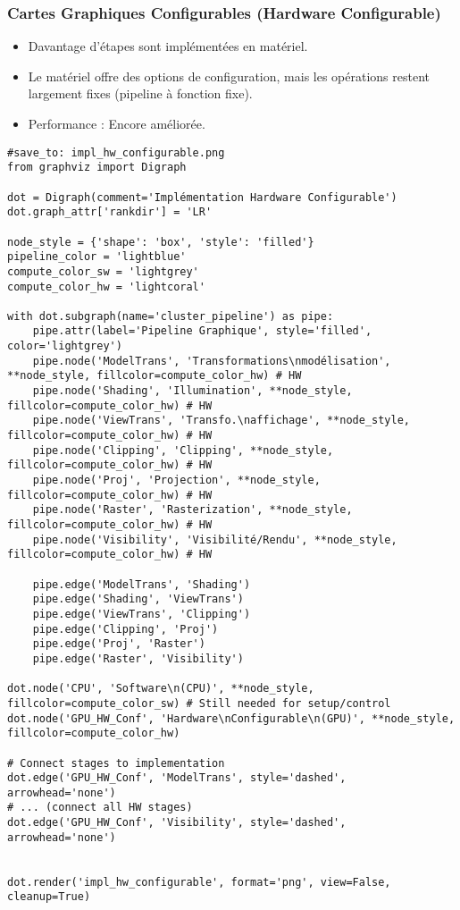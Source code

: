 \documentclass{article}
\begin{document}
\subsubsection{Cartes Graphiques Configurables (Hardware Configurable)}
\begin{itemize}
    \item Davantage d'étapes sont implémentées en matériel.
    \item Le matériel offre des options de configuration, mais les opérations restent largement fixes (pipeline à fonction fixe).
    \item Performance : Encore améliorée.
\end{itemize}

\begin{verbatim}
#save_to: impl_hw_configurable.png
from graphviz import Digraph

dot = Digraph(comment='Implémentation Hardware Configurable')
dot.graph_attr['rankdir'] = 'LR'

node_style = {'shape': 'box', 'style': 'filled'}
pipeline_color = 'lightblue'
compute_color_sw = 'lightgrey'
compute_color_hw = 'lightcoral'

with dot.subgraph(name='cluster_pipeline') as pipe:
    pipe.attr(label='Pipeline Graphique', style='filled', color='lightgrey')
    pipe.node('ModelTrans', 'Transformations\nmodélisation', **node_style, fillcolor=compute_color_hw) # HW
    pipe.node('Shading', 'Illumination', **node_style, fillcolor=compute_color_hw) # HW
    pipe.node('ViewTrans', 'Transfo.\naffichage', **node_style, fillcolor=compute_color_hw) # HW
    pipe.node('Clipping', 'Clipping', **node_style, fillcolor=compute_color_hw) # HW
    pipe.node('Proj', 'Projection', **node_style, fillcolor=compute_color_hw) # HW
    pipe.node('Raster', 'Rasterization', **node_style, fillcolor=compute_color_hw) # HW
    pipe.node('Visibility', 'Visibilité/Rendu', **node_style, fillcolor=compute_color_hw) # HW

    pipe.edge('ModelTrans', 'Shading')
    pipe.edge('Shading', 'ViewTrans')
    pipe.edge('ViewTrans', 'Clipping')
    pipe.edge('Clipping', 'Proj')
    pipe.edge('Proj', 'Raster')
    pipe.edge('Raster', 'Visibility')

dot.node('CPU', 'Software\n(CPU)', **node_style, fillcolor=compute_color_sw) # Still needed for setup/control
dot.node('GPU_HW_Conf', 'Hardware\nConfigurable\n(GPU)', **node_style, fillcolor=compute_color_hw)

# Connect stages to implementation
dot.edge('GPU_HW_Conf', 'ModelTrans', style='dashed', arrowhead='none')
# ... (connect all HW stages)
dot.edge('GPU_HW_Conf', 'Visibility', style='dashed', arrowhead='none')


dot.render('impl_hw_configurable', format='png', view=False, cleanup=True)
\end{verbatim}
\end{document}
